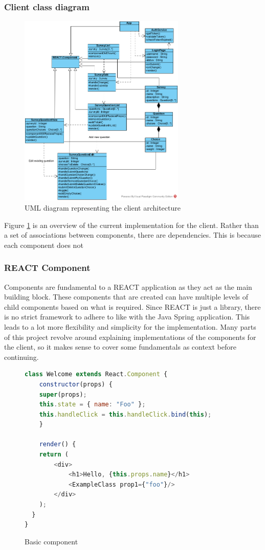 \subsubsection{Client class diagram}
\begin{figure}[ht]
    \centering
    \includegraphics[width=300px]{images/client_architecture.png}
    \caption{UML diagram representing the client architecture}
    \label{clientarch}
\end{figure}

\noindent
Figure \ref{clientarch} is an overview of the current implementation for the client.
Rather than a set of associations between components, there are dependencies.
This is because each component does not %

\subsubsection{REACT Component}
Components are fundamental to a REACT application as they act as the main building block.
These components that are created can have multiple levels of child components based on what is required.
Since REACT is just a library, there is no strict framework to adhere to like with the Java Spring application.
This leads to a lot more flexibility and simplicity for the implementation.
Many parts of this project revolve around explaining implementations of the components for the client, so it makes sense to cover
some fundamentals as context before continuing.

\begin{figure}[ht]
    \centering
    \begin{lstlisting}[language=Javascript]
class Welcome extends React.Component {
    constructor(props) {
    super(props);
    this.state = { name: "Foo" };
    this.handleClick = this.handleClick.bind(this);
    }
    
    render() {
    return (
        <div>
            <h1>Hello, {this.props.name}</h1>
            <ExampleClass prop1={"foo"}/>
        </div>
    );
  }
}
    \end{lstlisting}
    \caption{Basic component}   
    \label{basiccomponent}
\end{figure}

